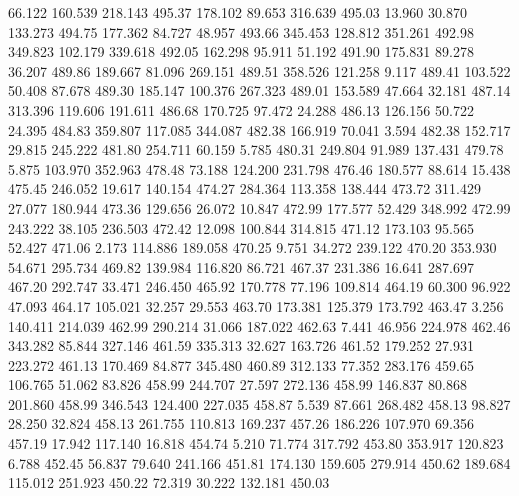   66.122  160.539  218.143       495.37
 178.102   89.653  316.639       495.03
  13.960   30.870  133.273       494.75
 177.362   84.727   48.957       493.66
 345.453  128.812  351.261       492.98
 349.823  102.179  339.618       492.05
 162.298   95.911   51.192       491.90
 175.831   89.278   36.207       489.86
 189.667   81.096  269.151       489.51
 358.526  121.258    9.117       489.41
 103.522   50.408   87.678       489.30
 185.147  100.376  267.323       489.01
 153.589   47.664   32.181       487.14
 313.396  119.606  191.611       486.68
 170.725   97.472   24.288       486.13
 126.156   50.722   24.395       484.83
 359.807  117.085  344.087       482.38
 166.919   70.041    3.594       482.38
 152.717   29.815  245.222       481.80
 254.711   60.159    5.785       480.31
 249.804   91.989  137.431       479.78
   5.875  103.970  352.963       478.48
  73.188  124.200  231.798       476.46
 180.577   88.614   15.438       475.45
 246.052   19.617  140.154       474.27
 284.364  113.358  138.444       473.72
 311.429   27.077  180.944       473.36
 129.656   26.072   10.847       472.99
 177.577   52.429  348.992       472.99
 243.222   38.105  236.503       472.42
  12.098  100.844  314.815       471.12
 173.103   95.565   52.427       471.06
   2.173  114.886  189.058       470.25
   9.751   34.272  239.122       470.20
 353.930   54.671  295.734       469.82
 139.984  116.820   86.721       467.37
 231.386   16.641  287.697       467.20
 292.747   33.471  246.450       465.92
 170.778   77.196  109.814       464.19
  60.300   96.922   47.093       464.17
 105.021   32.257   29.553       463.70
 173.381  125.379  173.792       463.47
   3.256  140.411  214.039       462.99
 290.214   31.066  187.022       462.63
   7.441   46.956  224.978       462.46
 343.282   85.844  327.146       461.59
 335.313   32.627  163.726       461.52
 179.252   27.931  223.272       461.13
 170.469   84.877  345.480       460.89
 312.133   77.352  283.176       459.65
 106.765   51.062   83.826       458.99
 244.707   27.597  272.136       458.99
 146.837   80.868  201.860       458.99
 346.543  124.400  227.035       458.87
   5.539   87.661  268.482       458.13
  98.827   28.250   32.824       458.13
 261.755  110.813  169.237       457.26
 186.226  107.970   69.356       457.19
  17.942  117.140   16.818       454.74
   5.210   71.774  317.792       453.80
 353.917  120.823    6.788       452.45
  56.837   79.640  241.166       451.81
 174.130  159.605  279.914       450.62
 189.684  115.012  251.923       450.22
  72.319   30.222  132.181       450.03
